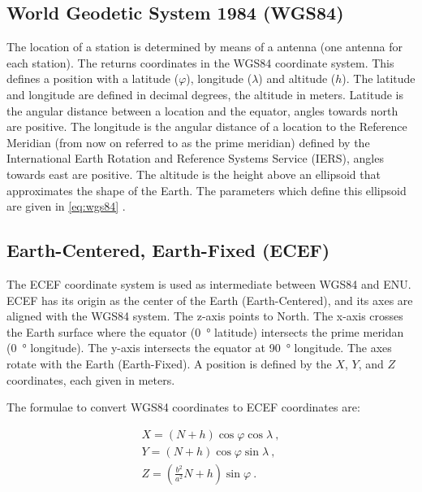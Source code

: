 \subsection{World Geodetic System 1984 (WGS84)}

The location of a \hisparc station is determined by means of a \gps
antenna (one antenna for each station). The \gps returns coordinates in
the WGS84 coordinate system. This defines a position with a latitude
($\varphi$), longitude ($\lambda$) and altitude ($h$). The latitude and
longitude are defined in decimal degrees, the altitude in meters.
Latitude is the angular distance between a location and the equator,
angles towards north are positive. The longitude is the angular distance
of a location to the Reference Meridian (from now on referred to as the
prime meridian) defined by the International Earth Rotation and
Reference Systems Service (IERS), angles towards east are positive. The
altitude is the height above an ellipsoid that approximates the shape of
the Earth. The parameters which define this ellipsoid are given in
\cref{eq:wgs84} \cite{nga:2014aa}.


\subsection{Earth-Centered, Earth-Fixed (ECEF)}

The ECEF coordinate system is used as intermediate between WGS84 and
ENU. ECEF has its origin as the center of the Earth (Earth-Centered),
and its axes are aligned with the WGS84 system. The z-axis points to
North. The x-axis crosses the Earth surface where the equator
(\SI{0}{\degree} latitude) intersects the prime meridan (\SI{0}{\degree}
longitude). The y-axis intersects the equator at \SI{90}{\degree}
longitude. The axes rotate with the Earth (Earth-Fixed). A position is
defined by the $X$, $Y$, and $Z$ coordinates, each given in meters.

The formulae to convert WGS84 coordinates to ECEF coordinates are:

\begin{equation}
    \begin{array}{l}
        X = \left(N + h\right) \cos{\varphi} \cos{\lambda} \ , \\
        Y = \left(N + h\right) \cos{\varphi} \sin{\lambda} \ , \\
        Z = \left(\frac{b^2}{a^2} N + h\right) \sin{\varphi} \ .
    \end{array}
\end{equation}

